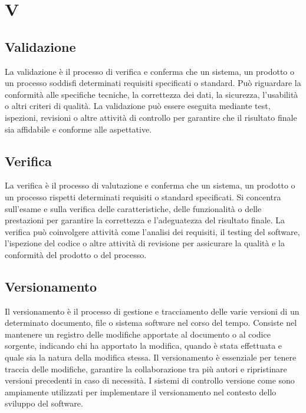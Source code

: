 \section{V}

\vspace{2em}
\subsection*{Validazione}
La validazione è il processo di verifica e conferma che un sistema, un prodotto o un processo soddisfi determinati requisiti specificati o standard. Può riguardare la conformità alle specifiche tecniche, la correttezza dei dati, la sicurezza, l'usabilità o altri criteri di qualità. La validazione può essere eseguita mediante test, ispezioni, revisioni o altre attività di controllo per garantire che il risultato finale sia affidabile e conforme alle aspettative.

\vspace{2em}
\subsection*{Verifica}
La verifica è il processo di valutazione e conferma che un sistema, un prodotto o un processo rispetti determinati requisiti o standard specificati. Si concentra sull'esame e sulla verifica delle caratteristiche, delle funzionalità o delle prestazioni per garantire la correttezza e l'adeguatezza del risultato finale. La verifica può coinvolgere attività come l'analisi dei requisiti, il testing del software, l'ispezione del codice o altre attività di revisione per assicurare la qualità e la conformità del prodotto o del processo.

\vspace{2em}
\subsection*{Versionamento}
Il versionamento è il processo di gestione e tracciamento delle varie versioni di un determinato documento, file o sistema software nel corso del tempo. Consiste nel mantenere un registro delle modifiche apportate al documento o al codice sorgente, indicando chi ha apportato la modifica, quando è stata effettuata e quale sia la natura della modifica stessa. Il versionamento è essenziale per tenere traccia delle modifiche, garantire la collaborazione tra più autori e ripristinare versioni precedenti in caso di necessità. I sistemi di controllo versione come  sono ampiamente utilizzati per implementare il versionamento nel contesto dello sviluppo del software.

